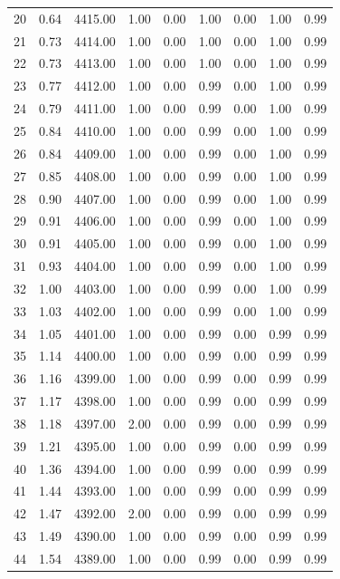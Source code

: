 \documentclass{article}\usepackage[]{graphicx}\usepackage[]{color}
\begin{document}
\begin{longtable}{rrrrrrrrr}
  20 & 0.64 & 4415.00 & 1.00 & 0.00 & 1.00 & 0.00 & 1.00 & 0.99 \\ 
  21 & 0.73 & 4414.00 & 1.00 & 0.00 & 1.00 & 0.00 & 1.00 & 0.99 \\ 
  22 & 0.73 & 4413.00 & 1.00 & 0.00 & 1.00 & 0.00 & 1.00 & 0.99 \\ 
  23 & 0.77 & 4412.00 & 1.00 & 0.00 & 0.99 & 0.00 & 1.00 & 0.99 \\ 
  24 & 0.79 & 4411.00 & 1.00 & 0.00 & 0.99 & 0.00 & 1.00 & 0.99 \\ 
  25 & 0.84 & 4410.00 & 1.00 & 0.00 & 0.99 & 0.00 & 1.00 & 0.99 \\ 
  26 & 0.84 & 4409.00 & 1.00 & 0.00 & 0.99 & 0.00 & 1.00 & 0.99 \\ 
  27 & 0.85 & 4408.00 & 1.00 & 0.00 & 0.99 & 0.00 & 1.00 & 0.99 \\ 
  28 & 0.90 & 4407.00 & 1.00 & 0.00 & 0.99 & 0.00 & 1.00 & 0.99 \\ 
  29 & 0.91 & 4406.00 & 1.00 & 0.00 & 0.99 & 0.00 & 1.00 & 0.99 \\ 
  30 & 0.91 & 4405.00 & 1.00 & 0.00 & 0.99 & 0.00 & 1.00 & 0.99 \\ 
  31 & 0.93 & 4404.00 & 1.00 & 0.00 & 0.99 & 0.00 & 1.00 & 0.99 \\ 
  32 & 1.00 & 4403.00 & 1.00 & 0.00 & 0.99 & 0.00 & 1.00 & 0.99 \\ 
  33 & 1.03 & 4402.00 & 1.00 & 0.00 & 0.99 & 0.00 & 1.00 & 0.99 \\ 
  34 & 1.05 & 4401.00 & 1.00 & 0.00 & 0.99 & 0.00 & 0.99 & 0.99 \\ 
  35 & 1.14 & 4400.00 & 1.00 & 0.00 & 0.99 & 0.00 & 0.99 & 0.99 \\ 
  36 & 1.16 & 4399.00 & 1.00 & 0.00 & 0.99 & 0.00 & 0.99 & 0.99 \\ 
  37 & 1.17 & 4398.00 & 1.00 & 0.00 & 0.99 & 0.00 & 0.99 & 0.99 \\ 
  38 & 1.18 & 4397.00 & 2.00 & 0.00 & 0.99 & 0.00 & 0.99 & 0.99 \\ 
  39 & 1.21 & 4395.00 & 1.00 & 0.00 & 0.99 & 0.00 & 0.99 & 0.99 \\ 
  40 & 1.36 & 4394.00 & 1.00 & 0.00 & 0.99 & 0.00 & 0.99 & 0.99 \\ 
  41 & 1.44 & 4393.00 & 1.00 & 0.00 & 0.99 & 0.00 & 0.99 & 0.99 \\ 
  42 & 1.47 & 4392.00 & 2.00 & 0.00 & 0.99 & 0.00 & 0.99 & 0.99 \\ 
  43 & 1.49 & 4390.00 & 1.00 & 0.00 & 0.99 & 0.00 & 0.99 & 0.99 \\ 
  44 & 1.54 & 4389.00 & 1.00 & 0.00 & 0.99 & 0.00 & 0.99 & 0.99 \\ 

\end{longtable}
\end{document}
